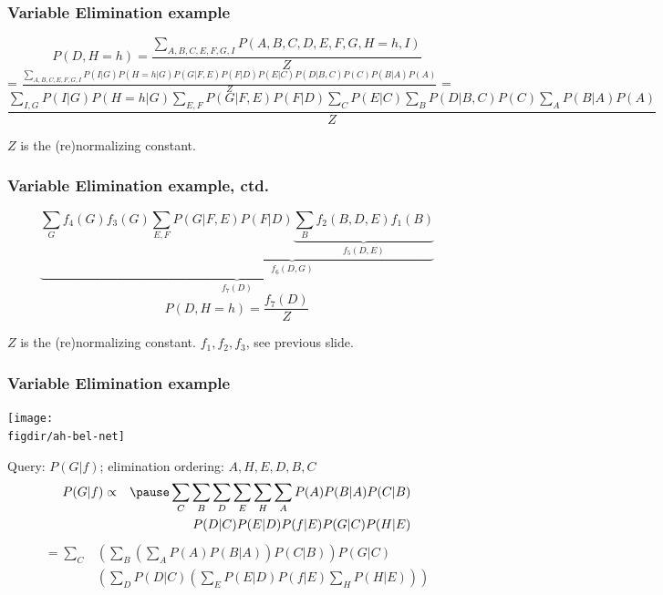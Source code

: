 \documentclass[12pt]{beamer} %
\newcommand{\figdir}{../../figures/ch06}
\begin{document}
\begin{frame}
\frametitle{Variable Elimination example}
%
\begin{center}
\small{
\[P(D,H=h) = \frac{\sum_{A,B,C,E,F,G,I}P(A,B,C,D,E,F,G,H=h,I)}{Z}\]
=
$\frac{\sum_{A,B,C,E,F,G,I}P(I|G)P(H=h|G)P(G|F,E)P(F|D)P(E|C)P(D|B,C)P(C)P(B|A)P(A)}{Z}$}
=
\tiny{\[\frac{\sum_{I,G} P(I|G) P(H=h|G) \sum_{E,F} P(G|F,E) P(F|D) \sum_C P(E|C) \sum_B P(D|B,C) P(C) \sum_A P(B|A)P(A)}{Z}\]}
\end{center}
$Z$ is the (re)normalizing constant.
\end{frame}

\begin{frame}
\frametitle{Variable Elimination example, ctd.}
%
\begin{center}
\[\underbrace{\sum_G f_4(G)f_3(G) \underbrace{\sum_{E,F} P(G|F,E)P(F|D) \underbrace{\sum_B f_2(B,D,E)f_1(B)}_{f_5(D,E)}}_{f_6(D,G)}}_{f_7(D)}\]
\[P(D,H=h) = \frac{f_7(D)}{Z}\]
\end{center}
%
%
$Z$ is the (re)normalizing constant. $f_1, f_2, f_3$, see previous slide.
\end{frame}

\begin{frame}
\frametitle{Variable Elimination example}
\begin{center}
\texttt{[image: \\figdir/ah-bel-net]}
\end{center}
Query: $P(G|f)$; 
elimination ordering: $A,H,E,D,B,C$
\begin{eqnarray*}
P(G|f) &\propto &\pause\sum_C \sum_B \sum_D \sum_E \sum_H \sum_A P(A) P(B|A) P(C|B)
\\
& &P(D|C) P(E|D) 
P(f|E) P(G|C) P(H|E)
\end{eqnarray*}
\pause
\begin{align*}
\mbox{} =  \sum_C &  \left(\sum_B\left(\sum_A P(A) P(B|A)\right) P(C|B)\right) P(G|C)\\
& \left(\sum_D P(D|C) \left(\sum_E P(E|D) P(f|E)\sum_H P(H|E)\right)\right)
\end{align*}

\end{frame}
\end{document}

